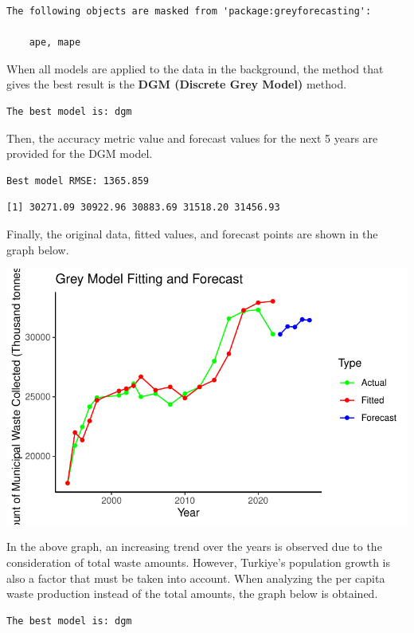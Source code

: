 \documentclass[
  11pt,
  a4paper,
  DIV=11,
  numbers=noendperiod]{scrartcl}
\begin{document}
\begin{verbatim}
The following objects are masked from 'package:greyforecasting':

    ape, mape
\end{verbatim}

When all models are applied to the data in the background, the method
that gives the best result is the \textbf{DGM (Discrete Grey Model)}
method.

\begin{verbatim}
The best model is: dgm 
\end{verbatim}

Then, the accuracy metric value and forecast values for the next 5 years
are provided for the DGM model.

\begin{verbatim}
Best model RMSE: 1365.859 
\end{verbatim}

\begin{verbatim}
[1] 30271.09 30922.96 30883.69 31518.20 31456.93
\end{verbatim}

Finally, the original data, fitted values, and forecast points are shown
in the graph below.

\includegraphics{project_files/figure-pdf/unnamed-chunk-48-1.pdf}

In the above graph, an increasing trend over the years is observed due
to the consideration of total waste amounts. However, Turkiye's
population growth is also a factor that must be taken into account. When
analyzing the per capita waste production instead of the total amounts,
the graph below is obtained.

\begin{verbatim}
The best model is: dgm 
\end{verbatim}
\end{document}

